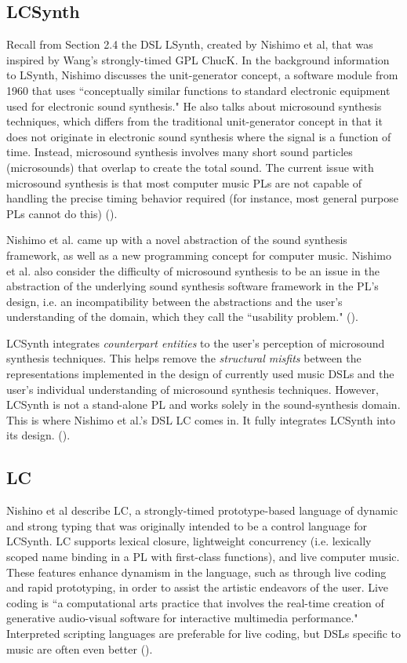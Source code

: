\documentclass{report}
\newcommand\citeparen[1]{(\cite{#1})}
\begin{document}
\subsection{LCSynth}
Recall from Section 2.4 the DSL LSynth, created by Nishimo et al, that was inspired by Wang's strongly-timed GPL ChucK. 
In  the background information to LSynth, Nishimo discusses the unit-generator concept, a  software module from 1960  that uses ``conceptually similar functions to standard electronic equipment used for electronic sound synthesis." He also talks about microsound  synthesis techniques, which differs from the traditional unit-generator concept in that it does not  originate in electronic sound synthesis where  the signal is a function  of time. Instead, microsound synthesis involves many short sound particles (microsounds) that overlap to create the total sound. The  current issue with microsound synthesis is that most  computer music PLs are not  capable of handling the precise  timing behavior required  (for  instance,  most general purpose PLs  cannot do this) \citeparen{nishino_2012}.

Nishimo et al. came up with a novel  abstraction of the sound synthesis framework, as well  as a new programming concept for computer music. Nishimo et al. also consider the difficulty of microsound synthesis to be an issue in the abstraction  of the underlying  sound synthesis software framework in the PL's design, i.e. an incompatibility between the abstractions and the user's understanding of the domain, which they call   the ``usability problem." \citeparen{nishino_2012}.

LCSynth integrates \textit{counterpart entities} to  the  user's perception of microsound synthesis techniques.  This helps remove the  \textit{structural misfits} between the representations  implemented in the design of currently used  music DSLs and the user's individual understanding of microsound synthesis techniques. However, LCSynth  is  not  a stand-alone  PL  and works  solely in the sound-synthesis domain. This is where Nishimo et al.'s DSL LC comes in. It fully integrates LCSynth into its design.   
 \citeparen{nishino_2012}.

\subsection{LC}
Nishino et al describe LC, a strongly-timed prototype-based language of dynamic and strong typing that was originally intended to be  a  control language for LCSynth. LC supports lexical closure, lightweight concurrency (i.e. lexically scoped name binding in a PL with first-class functions),  and live computer  music. These  features enhance dynamism in the language, such as through live coding  and  rapid prototyping,  in order to assist the  artistic endeavors of the user. Live coding is ``a computational arts practice that involves the real-time creation of generative audio-visual software for interactive multimedia performance." Interpreted scripting languages are preferable for live coding, but  DSLs specific to music are often even  better \citeparen{nishino_osaka_nakatsu_2013}.
\end{document}
